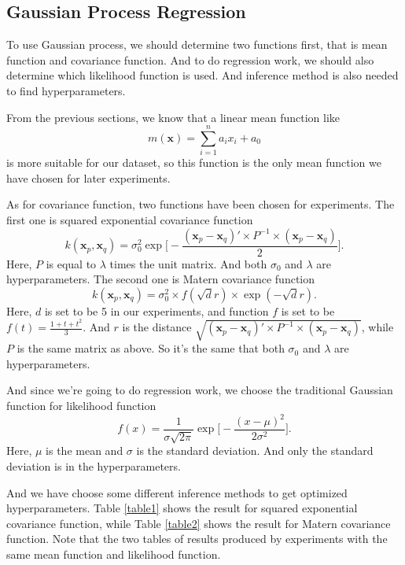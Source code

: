 \documentclass[a4paper]{article}
\newcommand{\bfx}{\mathbf{x}}
\begin{document}
\subsection{Gaussian Process Regression}
To use Gaussian process, we should determine two functions first, that is mean function and covariance function. And to do regression work, we should also determine which likelihood function is used. And inference method is also needed to find hyperparameters.

From the previous sections, we know that a linear mean function like
\begin{equation}
m(\bfx)=\sum_{i=1}^n a_ix_i + a_0
\end{equation}
is more suitable for our dataset, so this function is the only mean function we have chosen for later experiments.

As for covariance function, two functions have been chosen for experiments. The first one is squared exponential covariance function
\begin{equation}
k(\bfx_p,\bfx_q)=\sigma_0^2\exp\Big[-\frac{(\bfx_p-\bfx_q)'\times P^{-1} \times (\bfx_p-\bfx_q)}{2}\Big].
\end{equation}
Here, $P$ is equal to $\lambda$ times the unit matrix. And both $\sigma_0$ and $\lambda$ are hyperparameters. The second one is Matern covariance function
\begin{equation}
k(\bfx_p,\bfx_q)=\sigma_0^2\times f(\sqrt{d}r)\times \exp(-\sqrt{d}r).
\end{equation}
Here, $d$ is set to be 5 in our experiments, and function $f$ is set to be $f(t)=\frac{1+t+t^2}{3}$. And $r$ is the distance $\sqrt{(\bfx_p-\bfx_q)'\times P^{-1} \times (\bfx_p-\bfx_q)}$, while $P$ is the same matrix as above. So it's the same that both $\sigma_0$ and $\lambda$ are hyperparameters.

And since we're going to do regression work, we choose the traditional Gaussian function for likelihood function
\begin{equation}
f(x)=\frac{1}{\sigma\sqrt{2\pi}} \exp\Big[ -\frac{(x-\mu)^2}{2\sigma^2} \Big].
\end{equation}
Here, $\mu$ is the mean and $\sigma$ is the standard deviation. And only the standard deviation is in the hyperparameters.

And we have choose some different inference methods to get optimized hyperparameters. Table \ref{table1} shows the result for squared exponential covariance function, while Table \ref{table2} shows the result for Matern covariance function. Note that the two tables of results produced by experiments with the same mean function and likelihood function.
\end{document}
